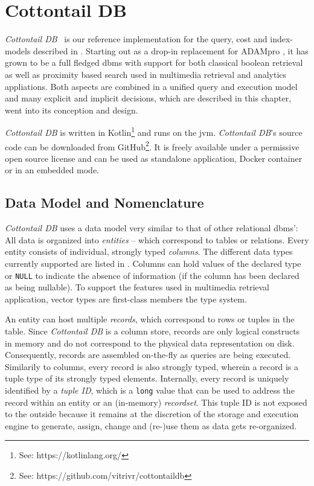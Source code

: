 \chapter{Cottontail DB}
\label{chapter:cottontaildb}

\emph{Cottontail DB}~\cite{Gasser:2020cottontail} is our reference implementation for the query, cost and index-models described in . Starting out as a drop-in replacement for ADAMpro \cite{Giangreco:2016adam}, it has grown to be a full fledged \acrshort{dbms} with support for both classical boolean retrieval as well as proximity based search used in multimedia retrieval and analytics appliations. Both aspects are combined in a unified query and execution model and many explicit and implicit decisions, which are described in this chapter, went into its conception and design.

\emph{Cottontail DB} is written in Kotlin\footnote{See: https://kotlinlang.org/} and runs on the \acrfull{jvm}. \emph{Cottontail DB}'s source code can be downloaded from GitHub\footnote{See: https://github.com/vitrivr/cottontaildb}. It is freely available under a permissive open source license and can be used as standalone application, Docker container or in an embedded mode.

\section{Data Model and Nomenclature} 

\emph{Cottontail DB} uses a data model very similar to that of other relational \acrshort{dbms}': All data is organized into \emph{entities} -- which correspond to tables or relations. Every entity consists of individual, strongly typed \emph{columns}. The different data types currently supported are listed in . Columns can hold values of the declared type or \texttt{NULL} to indicate the absence of information (if the column has been declared as being nullable). To support the features used in multimedia retrieval application, vector types are first-class members the type system.

An entity can host multiple \emph{records}, which correspond to rows or tuples in the table. Since \emph{Cottontail DB} is a column store, records are only logical constructs in memory and do not correspond to the physical data representation on disk. Consequently, records are assembled on-the-fly as queries are being executed. Similarily to columns, every record is also strongly typed, wherein a record is a tuple type of its strongly typed elements. Internally, every record is uniquely identified by a \emph{tuple ID}, which is a \texttt{long} value that can be used to address the record within an entity or an (in-memory) \emph{recordset}. This tuple ID is not exposed to the outside because it remains at the discretion of the storage and execution engine to generate, assign, change and (re-)use them as data gets re-organized.

